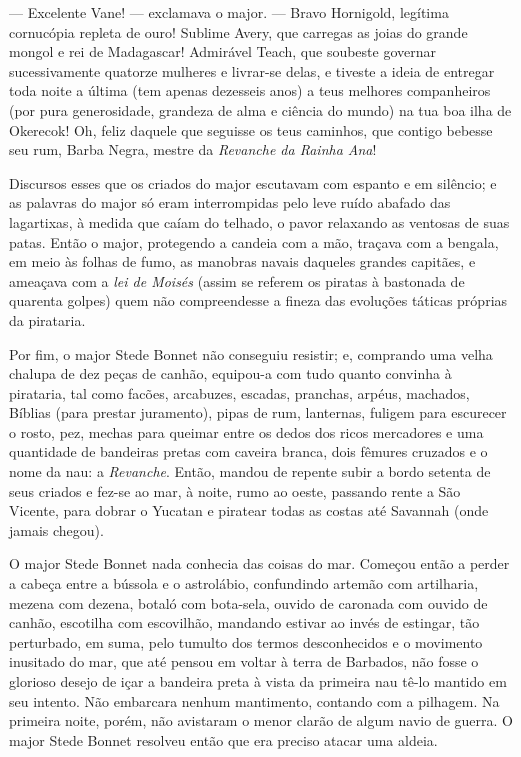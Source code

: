 --- Excelente Vane! --- exclamava o major. --- Bravo Hornigold, legítima cornucópia
repleta de ouro! Sublime Avery, que carregas as joias do grande mongol e
rei de Madagascar! Admirável Teach, que soubeste governar sucessivamente
quatorze mulheres e livrar-se delas, e tiveste a ideia de entregar toda
noite a última (tem apenas dezesseis anos) a teus melhores companheiros
(por pura generosidade, grandeza de alma e ciência do mundo) na tua boa
ilha de Okerecok! Oh, feliz daquele que seguisse os teus caminhos, que
contigo bebesse seu rum, Barba Negra, mestre da \textit{Revanche da Rainha
Ana}!

Discursos esses que os criados do major escutavam com espanto e em
silêncio; e as palavras do major só eram interrompidas pelo leve ruído
abafado das lagartixas, à medida que caíam do telhado, o pavor relaxando
as ventosas de suas patas. Então o major, protegendo a candeia com a mão,
traçava com a bengala, em meio às folhas de fumo, as manobras navais
daqueles grandes capitães, e ameaçava com a \textit{lei de Moisés} (assim
se referem os piratas à bastonada de quarenta golpes) quem não
compreendesse a fineza das evoluções táticas próprias da pirataria.

Por fim, o major Stede Bonnet não conseguiu resistir; e, comprando uma
velha chalupa de dez peças de canhão, equipou-a com tudo quanto convinha à
pirataria, tal como facões, arcabuzes, escadas, pranchas, arpéus,
machados, Bíblias (para prestar juramento), pipas de rum, lanternas,
fuligem para escurecer o rosto, pez, mechas para queimar entre os dedos
dos ricos mercadores e uma quantidade de bandeiras pretas com caveira
branca, dois fêmures cruzados e o nome da nau: a \textit{Revanche}. Então,
mandou de repente subir a bordo setenta de seus criados e fez-se ao mar, à
noite, rumo ao oeste, passando rente a São Vicente, para dobrar o Yucatan
e piratear todas as costas até Savannah (onde jamais chegou).

O major Stede Bonnet nada conhecia das coisas do mar. Começou então a
perder a cabeça entre a bússola e o astrolábio, confundindo artemão com
artilharia, mezena com dezena, botaló com bota-sela, ouvido de caronada
com ouvido de canhão, escotilha com escovilhão, mandando estivar ao invés
de estingar, tão perturbado, em suma, pelo tumulto dos termos
desconhecidos e o movimento inusitado do mar, que até pensou em voltar à
terra de Barbados, não fosse o glorioso desejo de içar a bandeira preta à
vista da primeira nau tê-lo mantido em seu intento. Não embarcara nenhum
mantimento, contando com a pilhagem. Na primeira noite, porém, não
avistaram o menor clarão de algum navio de guerra. O major Stede Bonnet
resolveu então que era preciso atacar uma aldeia.

